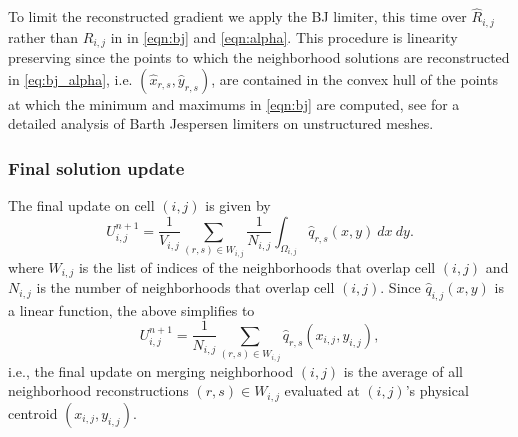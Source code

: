 
To limit the reconstructed gradient we apply the BJ limiter, this time over $\widehat{R}_{i,j}$ rather than $R_{i,j}$ in in \eqref{eqn:bj} and \eqref{eqn:alpha}.  This procedure is linearity preserving since the points to which the neighborhood solutions are reconstructed in \eqref{eq:bj_alpha}, i.e. $(\widehat{x}_{r,s}, \widehat{y}_{r,s})$, are contained in the convex hull of the points at which the minimum and maximums in \eqref{eqn:bj} are computed,  see \cite{giuliani2018analysis} for a detailed analysis of Barth Jespersen limiters on unstructured meshes.


\subsubsection*{Final solution update} 

The final update on cell $(i,j)$ is given by 
\begin{equation} \label{eqn:final_update_linear}
U^{n+1}_{i,j} =  \frac{1}{V_{i,j}}\sum_{(r,s) \in W_{i,j}}\frac{1}{N_{i,j}} \int_{\Omega_{i,j}}\widehat q_{r,s}(x,y) ~dx~dy.
\end{equation}
where $W_{i,j}$ is the list of indices of the neighborhoods that overlap cell $(i,j)$ and $N_{i,j}$ is the number of neighborhoods that overlap cell $(i,j)$. 
Since $\widehat{q}_{i,j}(x,y)$ is a linear function, the above simplifies to
\begin{equation} \label{eqn:final_update_linear2}
	U^{n+1}_{i,j} =   \frac{1}{N_{i,j}}\sum_{(r,s)  \in W_{i,j}}\hat{q}_{r,s}(x_{i,j},y_{i,j}),
\end{equation}
i.e., the final update on merging neighborhood $(i,j)$ is the average of all neighborhood reconstructions $(r,s) \in W_{i,j}$ evaluated at $(i,j)$'s physical centroid $(x_{i,j},y_{i,j})$. 


